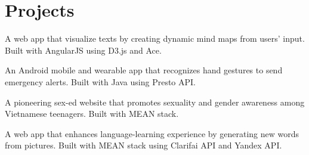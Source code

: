 \section{Projects}
\descript{}
A web app that visualize texts by creating dynamic mind maps from users' input. Built with AngularJS using D3.js and Ace.
\sectionsep

\descript{}
An Android mobile and wearable app that recognizes hand gestures to send emergency alerts. Built with Java using Presto API.
\sectionsep 

\descript{}
A pioneering sex-ed website that promotes sexuality and gender awareness among Vietnamese teenagers. Built with MEAN stack.
\sectionsep

\descript{}
A web app that enhances language-learning experience by generating new words from pictures. Built with MEAN stack using Clarifai API and Yandex API.
\sectionsep 